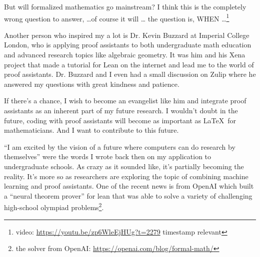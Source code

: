 \begin{displayquote}
    But will formalized mathematics go mainstream?
    I think this is the completely wrong question to answer, \ldots of course it will \ldots
    the question is, WHEN \ldots \footnote{video: \url{https://youtu.be/zp6WleEjHUg?t=2279} timestamp relevant}
\end{displayquote}

Another person who inspired my a lot is Dr. Kevin Buzzard at Imperial College London,
who is applying proof assistants to both undergraduate math education and advanced research topics like algebraic geometry.
It was him and his Xena project that made a tutorial for Lean on the internet and lead me to the world of proof assistants.
Dr. Buzzard and I even had a small discussion on Zulip where he answered my questions with great kindness and patience.

If there's a chance,
I wish to become an evangelist like him and integrate proof assistants as an inherent part of my future research.
I wouldn't doubt in the future, coding with proof assistants will become as important as \LaTeX\ for mathematicians.
And I want to contribute to this future.

``I am excited by the vision of a future where computers can do research by themselves''
were the words I wrote back then on my application to undergraduate schools.
As crazy as it sounded like, it's partially becoming the reality.
It's more so as researchers are exploring the topic of combining machine learning and proof assistants.
One of the recent news is from OpenAI which built a ``neural theorem prover'' for lean that was able to solve
a variety of challenging high-school olympiad problems\footnote{the solver from OpenAI: \url{https://openai.com/blog/formal-math/}}.
